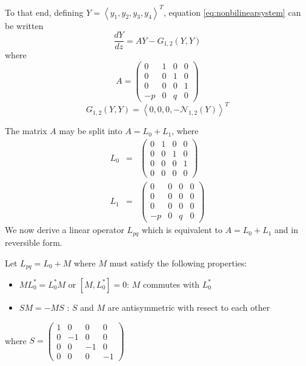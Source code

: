 To that end, defining  $Y=\left<y_1,y_2,y_3,y_4\right>^T$, equation 
\eqref{eq:nonbilinearsystem} can be written
\begin{equation}\label{eq:matrixeq1}
 \frac{ dY }{ dz } = A Y - G_{1,2}(Y,Y)
\end{equation}
where 
\begin{equation}\label{eq:nonlinear}
A = \left(\begin{array}{cccc}0&1&0&0\\0&0&1&0\\0&0&0&1\\-p&0&q&0\end{array}\right) 
\end{equation}
\begin{equation}\label{eq:nonlinear}
G_{1,2}(Y,Y) = \left<0,0,0,-\mathcal{N}_{1,2}\left(Y\right)\right>^T
\end{equation}

The matrix $A$ may be split into $A = L_0 + L_1 $, where 
\begin{subequations}
\begin{eqnarray}
L_0 &=& \left(\begin{array}{cccc}0&1&0&0\\0&0&1&0\\0&0&0&1\\0&0&0&0\end{array}\right) \\
L_1 &=& \left(\begin{array}{cccc}0&0&0&0\\0&0&0&0\\0&0&0&0\\-p&0&q&0\end{array}\right) 
\end{eqnarray}
\end{subequations}
We now derive a linear operator $L_{pq}$ which is equivalent to $A=L_0+L_1$ and in reversible form.

Let $L_{pq} = L_0 + M $ where $M$ must satisfy the following properties:

\begin{itemize}
\item $ M L_0^* = L_0^* M $ or $ \left[M, L_0^*\right]=0$: $M$ commutes with $L_0^*$
\item $ S M  = -M S $ : $S$ and $M$ are antisymmetric with resect to each other
\end{itemize}
where $S = \left(\begin{array}{cccc}1&0&0&0\\0&-1&0&0\\0&0&-1&0\\0&0&0&-1\end{array}\right) $


